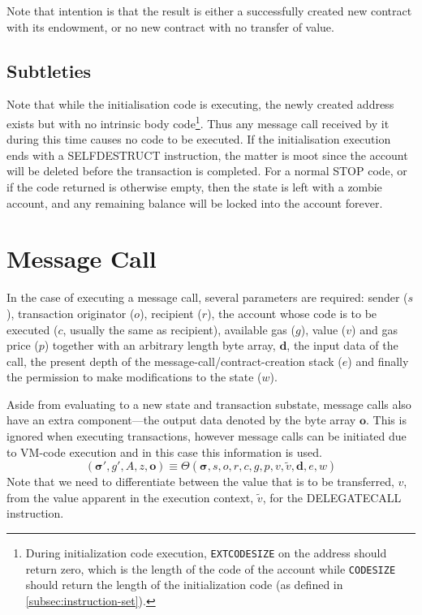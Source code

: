 \documentclass[9pt,oneside]{amsart}
\begin{document}
\begin{multicols}{2}
Note that intention is that the result is either a successfully created new contract with its endowment, or no new contract with no transfer of value.

\subsection{Subtleties}
Note that while the initialisation code is executing, the newly created address exists but with no intrinsic body code\footnote{During initialization code execution, \texttt{EXTCODESIZE} on the address should return zero, which is the length of the code of the account while \texttt{CODESIZE} should return the length of the initialization code (as defined in \ref{subsec:instruction-set}).}. Thus any message call received by it during this time causes no code to be executed. If the initialisation execution ends with a {\small SELFDESTRUCT} instruction, the matter is moot since the account will be deleted before the transaction is completed. For a normal {\small STOP} code, or if the code returned is otherwise empty, then the state is left with a zombie account, and any remaining balance will be locked into the account forever.

\section{Message Call} \label{ch:call}
In the case of executing a message call, several parameters are required: sender ($s$), transaction originator ($o$), recipient ($r$), the account whose code is to be executed ($c$, usually the same as recipient), available gas ($g$), value ($v$) and gas price ($p$) together with an arbitrary length byte array, $\mathbf{d}$, the input data of the call, the present depth of the message-call/contract-creation stack ($e$) and finally the permission to make modifications to the state ($w$).

Aside from evaluating to a new state and transaction substate, message calls also have an extra component---the output data denoted by the byte array $\mathbf{o}$. This is ignored when executing transactions, however message calls can be initiated due to VM-code execution and in this case this information is used.
\begin{equation}
(\boldsymbol{\sigma}', g', A, z, \mathbf{o}) \equiv \Theta(\boldsymbol{\sigma}, s, o, r, c, g, p, v, \tilde{v}, \mathbf{d}, e, w)
\end{equation}
Note that we need to differentiate between the value that is to be transferred, $v$, from the value apparent in the execution context, $\tilde{v}$, for the {\small DELEGATECALL} instruction.


\end{multicols}
\end{document}
